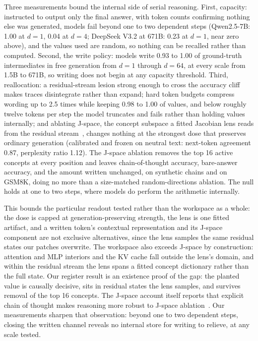 \documentclass{article}
\begin{document}
Three measurements bound the internal side of serial reasoning. First, capacity: instructed to output only the final answer, with token counts confirming nothing else was generated, models fail beyond one to two dependent steps (Qwen2.5-7B: 1.00 at $d=1$, 0.04 at $d=4$; DeepSeek V3.2 at 671B: 0.23 at $d=1$, near zero above), and the values used are random, so nothing can be recalled rather than computed. Second, the write policy: models write 0.93 to 1.00 of ground-truth intermediates in free generation from $d=1$ through $d=64$, at every scale from 1.5B to 671B, so writing does not begin at any capacity threshold. Third, reallocation: a residual-stream lesion strong enough to cross the accuracy cliff makes traces disintegrate rather than expand; hard token budgets compress wording up to 2.5 times while keeping 0.98 to 1.00 of values, and below roughly twelve tokens per step the model truncates and fails rather than holding values internally; and ablating J-space, the concept subspace a fitted Jacobian lens reads from the residual stream~\citep{gurnee2026jspace}, changes nothing at the strongest dose that preserves ordinary generation (calibrated and frozen on neutral text: next-token agreement 0.87, perplexity ratio 1.12). The J-space ablation removes the top 16 active concepts at every position and leaves chain-of-thought accuracy, bare-answer accuracy, and the amount written unchanged, on synthetic chains and on GSM8K, doing no more than a size-matched random-directions ablation. The null holds at one to two steps, where models do perform the arithmetic internally.

This bounds the particular readout tested rather than the workspace as a whole: the dose is capped at generation-preserving strength, the lens is one fitted artifact, and a written token's contextual representation and its J-space component are not exclusive alternatives, since the lens samples the same residual states our patches overwrite. The workspace also exceeds J-space by construction: attention and MLP interiors and the KV cache fall outside the lens's domain, and within the residual stream the lens spans a fitted concept dictionary rather than the full state. Our register result is an existence proof of the gap: the planted value is causally decisive, sits in residual states the lens samples, and survives removal of the top 16 concepts. The J-space account itself reports that explicit chain of thought makes reasoning more robust to J-space ablation~\citep{gurnee2026jspace}. Our measurements sharpen that observation: beyond one to two dependent steps, closing the written channel reveals no internal store for writing to relieve, at any scale tested.
\end{document}
